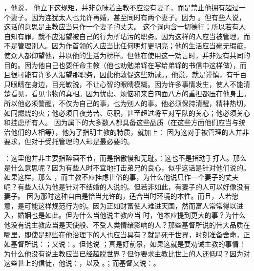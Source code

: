 ，他说， 他立下这规矩，并非意味着主教不应没有妻子，而是禁止他拥有超过一个妻子。因为连犹太人也允许再婚，甚至同时有两个妻子。因为 。但有些人说，这话的意思是主教应当只作一个妻子的丈夫。 这个词内含一切德行；所以若有人自知有罪，就不应渴望被自己的行为所玷污的职务。因为这样的人应当被管理，而不是管理别人。因为作首领的人应当比任何明灯更明亮；他的生活应当毫无瑕疵，使众人都仰望他，并以他的生活为榜样。但他在使用这一劝言时，并非没有共同的目的。因为他自己也要任命主教（他也劝勉弟铎在写给弟铎的书信中这样做），而且很可能有许多人渴望那职务，因此他敦促这些劝诫。，他说，就是谨慎，有千百只眼睛在身边，目光敏锐，不让心智的眼睛模糊。因为许多事情发生，使人不能清楚看见，看见事物的真相。因为忧虑、烦恼和来自四面八方的重担都压在他身上。所以他必须警醒，不仅为自己的事，也为别人的事。他必须保持清醒，精神热切，如同燃烧的火；他必须日夜劳苦、尽职，甚至超过将军对军队的关心；他必须关心和挂虑所有人。 因为属下的大多数人都具备这些品质（在这些方面他们应当与统治他们的人相等），他为了指明主教的特质，就加上： 因为这对于被管理的人并非要求，但对于受托管理的人却是最必要的。\par

：这里他并非主要指醉酒不节，而是指傲慢和无耻。：这也不是指动手打人。那么  是什么意思呢？因为有些人时不宜地打击弟兄的良心，似乎这话是针对他们说的。 如果这样，那么 ，而主教不应挂虑世俗的事，为什么他说只作一个妻子的丈夫呢？有些人认为他是针对不结婚的人说的。但若非如此，有妻子的人可以好像没有妻子。 因为那时这种自由是恰当允许的，适合当时环境的本性。而且，人若愿意，是可能这样规范行为的。因为正如财富使人难进天国，然而富人常常得以进入，婚姻也是如此。但为什么当他说主教应当  时，他本应提到更大的事？为什么他没有说主教应当是天使般、不受人类情绪影响的人？那些基督所说的伟大品质在哪里，即使是那些在他治理下的人也应当具有？就是死于世界，时刻准备舍命，正如基督所说：；又说：。但他说 ；真是好前景，如果这就是要劝诫主教的事情！为什么他没有说主教应当已经超脱世界？但你要求主教比世上的人还低吗？因为对这些世上的信徒，他说：，以及 。；而基督又说：。\par

